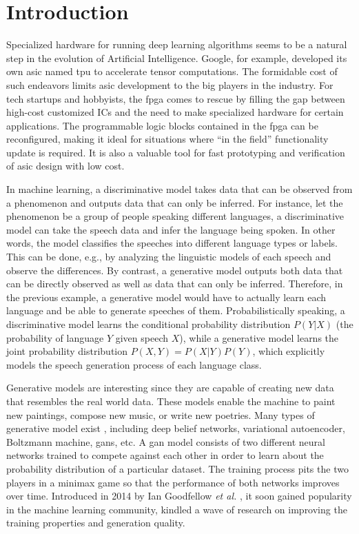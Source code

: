 
\chapter{Introduction}

Specialized hardware for running deep learning algorithms seems to be a natural step in the evolution of
Artificial Intelligence.  Google, for example, developed its own \gls{asic} named \gls{tpu}
to accelerate tensor computations. The formidable cost of such endeavors limits \gls{asic} development to
the big players in the industry. For tech startups and hobbyists, the \gls{fpga} comes to rescue by filling
the gap between high-cost customized ICs and the need to make specialized hardware for certain
applications. The programmable logic blocks contained in the \gls{fpga} can be reconfigured, making it
ideal for situations where ``in the field'' functionality update is required. It is also a valuable tool
for fast prototyping and verification of \gls{asic} design with low cost.

In machine learning, a discriminative model takes data that can be observed from a phenomenon and outputs
data that can only be inferred. For instance, let the phenomenon be a group of people speaking different
languages, a discriminative model can take the speech data and infer the language being spoken. In other
words, the model classifies the speeches into different language types or labels. This can be done, e.g.,
by analyzing the linguistic models of each speech and observe the differences. By contrast, a generative
model outputs both data that can be directly observed as well as data that can only be inferred. Therefore,
in the previous example, a generative model would have to actually learn each language and be able to generate
speeches of them. Probabilistically speaking, a discriminative model learns the conditional probability
distribution $P(Y \vert X)$ (the probability of language $Y$ given speech $X$), while a generative model
learns the joint probability distribution $P(X,Y) = P(X \vert Y)P(Y)$, which explicitly models the speech
generation process of each language class.

Generative models are interesting since they are capable of creating new data that resembles the real world
data. These models enable the machine to paint new paintings, compose new music, or write new poetries.
Many types of generative model exist \cite{Goodfellow-et-al-2016},
including deep belief networks, variational autoencoder,
Boltzmann machine, \glspl{gan}, etc. A \gls{gan} model consists of two different neural networks trained to
compete against each other in order to learn about the probability distribution of a particular dataset.
The training process pits the two players in a minimax game so that the performance of both networks improves
over time. Introduced in 2014 by Ian Goodfellow \textit{et al.} \cite{goodfellow:gan}, it soon gained
popularity in the machine learning community, kindled a wave of research on improving the training properties
and generation quality.

